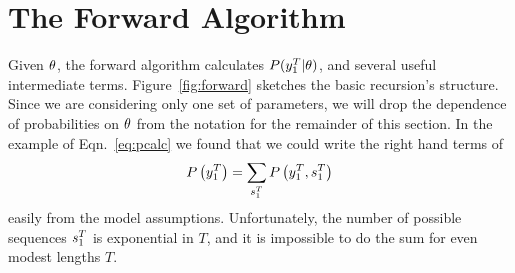 \section{The Forward Algorithm}
\label{sec:forward}

Given $\theta$, the forward algorithm calculates
$P(y_{1}^{T}|\theta)$, and several useful intermediate terms.
Figure~\ref{fig:forward} sketches the basic recursion's structure.
Since we are considering only one set of parameters, we will drop the
dependence of probabilities on $\theta$ from the notation for the
remainder of this section.  In the example of Eqn.~\eqref{eq:pcalc} we
found that we could write the right hand terms of
\begin{equation*}
   P\left( y_{1}^{T} \right) = \sum_{s_{1}^{T}}
   P\left( y_{1}^{T},s_{1}^{T} \right)
\end{equation*}
easily from the model assumptions.  Unfortunately, the number of
possible sequences $s_{1}^{T}$ is exponential in $T$, and it is
impossible to do the sum for even modest lengths $T$.

